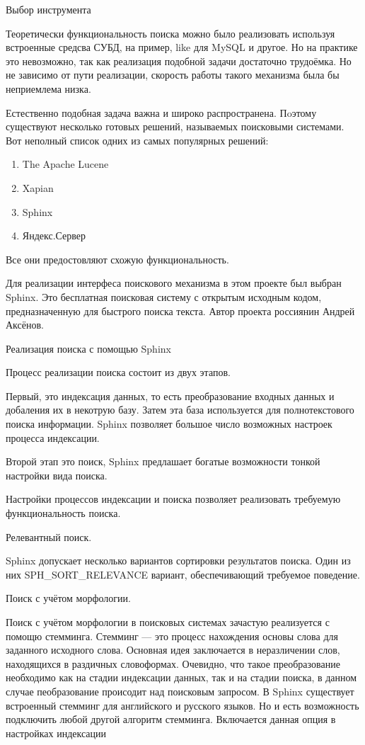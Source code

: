 
Выбор инструмента


Теоретически функциональность поиска можно было реализовать используя
встроенные средсва СУБД, на пример, like для MySQL и другое.
Но на практике это невозможно, так как реализация подобной задачи 
достаточно трудоёмка.
Но не зависимо от пути реализации, скорость работы такого механизма была бы неприемлема низка.

Естественно подобная задача важна и широко распространена.
Пoэтому существуют несколько готовых решений, называемых поисковыми системами.
Вот неполный список одних из самых популярных решений:
\begin{enumerate}
    \item The Apache Lucene 
    \item Xapian
    \item Sphinx
    \item Яндекс.Сервер
\end{enumerate}

Все они предостовляют схожую функциональность.

Для реализации интерфеса поискового механизма в этом проекте был выбран Sphinx. 
Это бесплатная поисковая систему с открытым исходным кодом, 
предназначенную для быстрого поиска текста. 
Автор проекта россиянин Андрей Аксёнов.


Реализация поиска с помощью Sphinx

Процесс реализации поиска состоит из двух этапов.

Первый, это индексация данных, то есть преобразование входных данных и добаления их в некотрую базу.
Затем эта база используется для полнотекстового поиска информации.
Sphinx позволяет большое число возможных настроек процесса индексации.

Второй этап это поиск, Sphinx предлашает богатые возможности тонкой настройки вида поиска.

Настройки процессов индексации и поиска позволяет реализовать требуемую функциональность поиска.


Релевантный поиск.

Sphinx допускает несколько вариантов сортировки результатов поиска.
Один из них SPH\_SORT\_RELEVANCE вариант, обеспечивающий требуемое поведение.

Поиск с учётом морфологии.

Поиск с учётом морфологии в поисковых системах зачастую реализуется с помощю стемминга. Стемминг — это процесс нахождения основы слова для заданного исходного слова.
Основная идея заключается в неразличении слов, находящихся в раздичных словоформах.
Очевидно, что такое преобразование необходимо как на стадии индексации данных, так и на стадии поиска, в данном случае пеобразование происодит над поисковым запросом.
В Sphinx существует встроенный стемминг для английского и русского языков.
Но и есть возможность подключить любой другой алгоритм стемминга.
Включается данная опция в настройках индексации 

